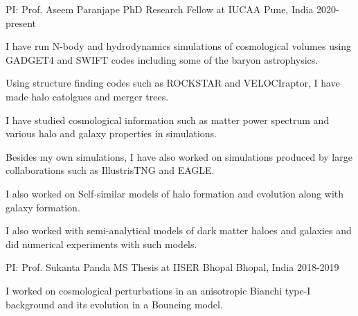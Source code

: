 \begin{cventries}

{
\cventry
{PI: Prof. Aseem Paranjape} %
{PhD Research Fellow at IUCAA} %
{Pune, India} %
{2020-present} %
{ %
\begin{cvitems}
\item {I have run N-body and hydrodynamics simulations of cosmological volumes using GADGET4 and SWIFT codes including some of the baryon astrophysics.}
\item {Using structure finding codes such as ROCKSTAR and VELOCIraptor, I have made halo catolgues and merger trees.}
\item {I have studied cosmological information such as matter power spectrum and various halo and galaxy properties in simulations.}
\item {Besides my own simulations, I have also worked on simulations produced by large collaborations such as IllustrisTNG and EAGLE.}
\item {I also worked on Self-similar models of halo formation and evolution along with galaxy formation.}
\item {I also worked with semi-analytical models of dark matter haloes and galaxies and did numerical experiments with such models.}
\end{cvitems}
}
}


{
\cventry
{PI: Prof. Sukanta Panda} %
{MS Thesis at IISER Bhopal} %
{Bhopal, India} %
{2018-2019} %
{ %
\begin{cvitems}
\item {I worked on cosmological perturbations in an anisotropic Bianchi type-I background and its evolution in a Bouncing model.}
\end{cvitems}
}
}

\end{cventries}



